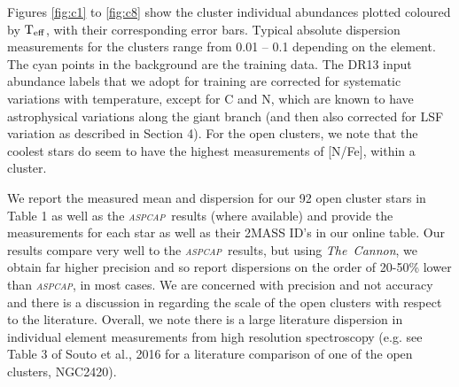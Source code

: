\documentclass[14pt, preprint2]{aastex6}
\newcommand{\project}[1]{\textsl{#1}}
\newcommand{\tc}{\project{The~Cannon}}
\newcommand{\aspcap}{\project{\textsc{aspcap}}}
\newcommand{\teff}{\mbox{$\rm T_{eff}$}}
\begin{document}
Figures \ref{fig:c1} to \ref{fig:c8} show the cluster individual abundances plotted coloured by \teff, with their corresponding error bars. Typical absolute dispersion measurements for the clusters range from 0.01 -- 0.1 depending on the element.  The cyan points in the background are the training data. The DR13 input abundance labels that we adopt for training are corrected for systematic variations with temperature, except for C and N, which are known to have astrophysical variations along the giant branch (and then also corrected for LSF variation as described in Section 4). For the open clusters, we note that the coolest stars do seem to have the highest measurements of [N/Fe], within a cluster. 

We report the measured mean and dispersion for our 92 open cluster stars in Table 1 as well as the \aspcap\ results (where available) and provide the measurements for each star as well as their 2MASS ID's in our online table. Our results compare very well to the \aspcap\ results, but using \tc, we obtain far higher precision and so report dispersions on the order of 20-50\% lower than \aspcap, in most cases. We are concerned with precision and not accuracy and there is a discussion in \citet{Holtzman2015} regarding the scale of the open clusters with respect to the literature. Overall, we note there is a large literature dispersion in individual element measurements from high resolution spectroscopy (e.g. see Table 3 of Souto et al., 2016 for a literature comparison of one of the open clusters, NGC2420). 
\end{document}

